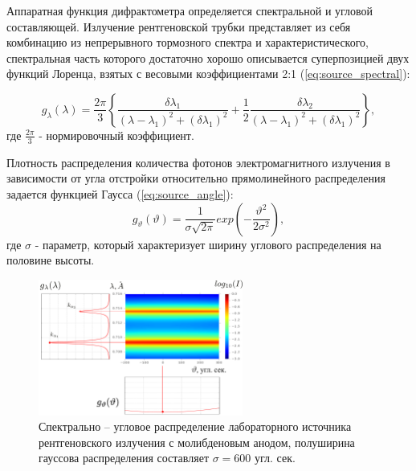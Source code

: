 \label{sec:source_section}
Аппаратная функция дифрактометра определяется спектральной и угловой
составляющей. Излучение рентгеновской трубки представляет из себя комбинацию из
 непрерывного тормозного спектра \cite{blohin1957} и характеристического, спектральная часть
 которого достаточно хорошо описывается суперпозицией двух функций Лоренца, взятых с
 весовыми коэффициентами 2:1 (\ref{eq:source_spectral}):

 \begin{equation} \label{eq:source_spectral}
   g_{\lambda} (\lambda) = \frac{2\pi}{3}  \left \{ \frac{\delta\lambda_1}{(\lambda - \lambda_1)^2+
   (\delta \lambda_1)^2} + \frac{1}{2} \frac{\delta\lambda_2}{(\lambda-\lambda_1)^2+(\delta\lambda_1)^2} \right \},
  \end{equation}
\noindent
где $\frac{2\pi}{3}$ - нормировочный коэффициент.

  Плотность распределения количества фотонов электромагнитного излучения в зависимости от угла
  отстройки относительно прямолинейного распределения задается функцией Гаусса (\ref{eq:source_angle}):
\begin{equation} \label{eq:source_angle}
  g_{\vartheta} (\vartheta) = \frac{1}{\sigma \sqrt{ 2\pi}} exp  ( -\frac{\vartheta^2}{2\sigma^2} ),
 \end{equation}
\noindent
где $\sigma$ - параметр, который характеризует ширину углового распределения на половине высоты.

\begin{figure}[H]
  \centering
  \includegraphics[width=0.6\textwidth]{images/source_distrubition.png}
  \caption{Спектрально – угловое распределение лабораторного источника рентгеновского
   излучения с молибденовым анодом, полуширина гауссова распределения составляет $\sigma = 600$ угл. сек. }
  \label{ris:source_distrubition}
\end{figure}
